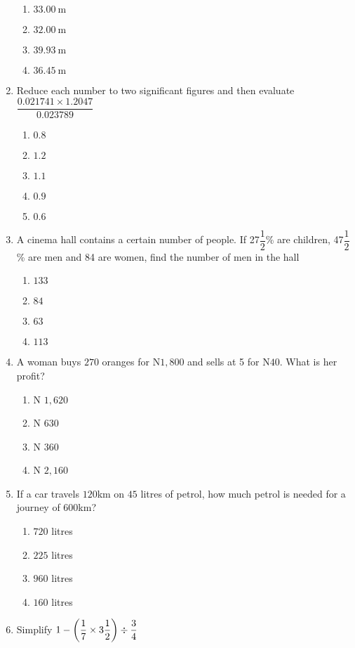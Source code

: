 \begin{multicols}{2}
\begin{enumerate}[label={\arabic*.}]
\begin{enumerate}[label={\Alph*.}]
    \item \(\SI{33.00}{\meter}\)
    \item \(\SI{32.00}{\meter}\)
    \item \(\SI{39.93}{\meter}\)
    \item \(\SI{36.45}{\meter}\)
    \end{enumerate}
\item Reduce each number to two significant figures and then evaluate \(\dfrac{0.021741 \times 1.2047}{0.023789}\)
    \begin{enumerate}[label={\Alph*.}]
    \item \(0.8\)
    \item \(1.2\)
    \item \(1.1\)
    \item \(0.9\)
    \item \(0.6\)
    \end{enumerate}
\item A cinema hall contains a certain number of people. If 27\(\dfrac{1}{2}\)\% are children, 47\(\dfrac{1}{2}\)\% are men and 84 are 
women, find the number of men in the hall
    \begin{enumerate}[label={\Alph*.}]
    \item \(133\)
    \item \(84\)
    \item \(63\)
    \item \(113\)
    \end{enumerate}
\item A woman buys \(270\) oranges for N\(1,800\) and sells at 5 for N\(40\). What is her profit?
    \begin{enumerate}[label={\Alph*.}]
    \item N \(1,620\)
    \item N \(630\)
    \item N \(360\)
    \item N \(2,160\)
    \end{enumerate}
\item If a car travels \(120\)km on \(45\) litres of petrol, how much petrol is needed for a journey of \(600\)km?
    \begin{enumerate}[label={\Alph*.}]
    \item \(720\) litres
    \item \(225\) litres
    \item \(960\) litres
    \item \(160\) litres
    \end{enumerate}
\item Simplify \(1 - \left(\dfrac{1}{7} \times 3\dfrac{1}{2}\right) \divisionsymbol \dfrac{3}{4}\)

\end{enumerate}
\end{multicols}
